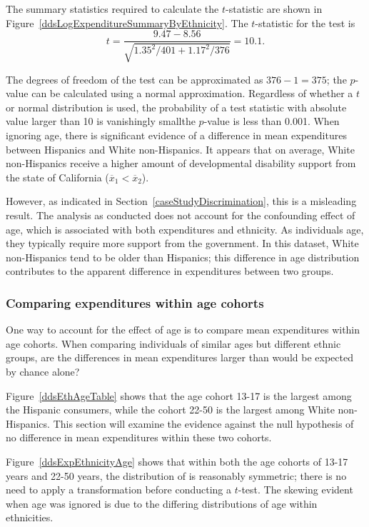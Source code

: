 The summary statistics required to calculate the $t$-statistic are shown in Figure~\ref{ddsLogExpenditureSummaryByEthnicity}. The $t$-statistic for the test is 
\[t = \frac{9.47 - 8.56}{\sqrt{1.35^2/401 + 1.17^2/376}} = 10.1.\]

\textD{\newpage}

The degrees of freedom of the test can be approximated as $376 - 1 = 375$; the $p$-value can be calculated using a normal approximation. Regardless of whether a $t$ or normal distribution is used, the probability of a test statistic with absolute value larger than 10 is vanishingly small\textemdash the $p$-value is less than 0.001. When ignoring age, there is significant evidence of a difference in mean expenditures between Hispanics and White non-Hispanics. It appears that on average, White non-Hispanics receive a higher amount of developmental disability support from the state of California ($\overline{x}_1 < \overline{x}_2$).

However, as indicated in Section~\ref{caseStudyDiscrimination}, this is a misleading result. The analysis as conducted does not account for the confounding effect of age, which is associated with both expenditures and ethnicity. As individuals age, they typically require more support from the government. In this dataset, White non-Hispanics tend to be older than Hispanics; this difference in age distribution contributes to the apparent difference in expenditures between two groups.

\subsubsection{Comparing expenditures within age cohorts}

One way to account for the effect of age is to compare mean expenditures within age cohorts. When comparing individuals of similar ages but different ethnic groups, are the differences in mean expenditures larger than would be expected by chance alone? 

Figure~\ref{ddsEthAgeTable} shows that the age cohort 13-17 is the largest among the Hispanic consumers, while the cohort 22-50 is the largest among White non-Hispanics. This section will examine the evidence against the null hypothesis of no difference in mean expenditures within these two cohorts.

Figure~\ref{ddsExpEthnicityAge} shows that within both the age cohorts of 13-17 years and 22-50 years, the distribution of  is reasonably symmetric; there is no need to apply a transformation before conducting a $t$-test. The skewing evident when age was ignored is due to the differing distributions of age within ethnicities. 

